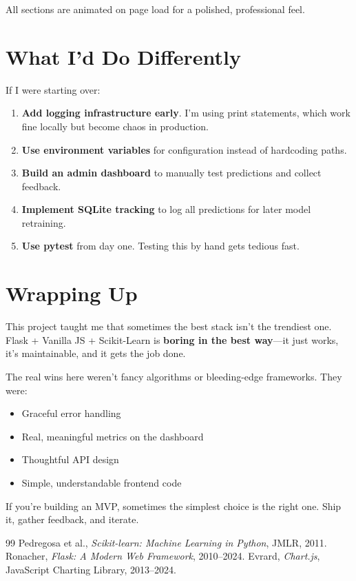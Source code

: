 \documentclass[12pt, a4paper]{article}
\begin{document}
All sections are animated on page load for a polished, professional feel.

\section{What I'd Do Differently}

If I were starting over:

\begin{enumerate}
    \item \textbf{Add logging infrastructure early}. I'm using print statements, which work fine locally but become chaos in production.
    \item \textbf{Use environment variables} for configuration instead of hardcoding paths.
    \item \textbf{Build an admin dashboard} to manually test predictions and collect feedback.
    \item \textbf{Implement SQLite tracking} to log all predictions for later model retraining.
    \item \textbf{Use pytest} from day one. Testing this by hand gets tedious fast.
\end{enumerate}

\section{Wrapping Up}

This project taught me that sometimes the best stack isn't the trendiest one. Flask + Vanilla JS + Scikit-Learn is \textbf{boring in the best way}---it just works, it's maintainable, and it gets the job done.

The real wins here weren't fancy algorithms or bleeding-edge frameworks. They were:

\begin{itemize}
    \item Graceful error handling
    \item Real, meaningful metrics on the dashboard
    \item Thoughtful API design
    \item Simple, understandable frontend code
\end{itemize}

If you're building an MVP, sometimes the simplest choice is the right one. Ship it, gather feedback, and iterate.

\begin{thebibliography}{99}
 Pedregosa et al., \textit{Scikit-learn: Machine Learning in Python}, JMLR, 2011.
 Ronacher, \textit{Flask: A Modern Web Framework}, 2010--2024.
 Evrard, \textit{Chart.js}, JavaScript Charting Library, 2013--2024.
\end{thebibliography}
\end{document}

